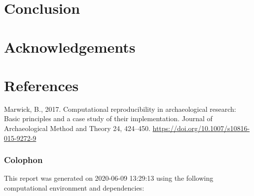 \documentclass[
]{article}
\begin{document}
\hypertarget{conclusion}{%
\section{Conclusion}\label{conclusion}}

\hypertarget{acknowledgements}{%
\section{Acknowledgements}\label{acknowledgements}}

\newpage

\hypertarget{references}{%
\section{References}\label{references}}

\hypertarget{refs}{}
\leavevmode\hypertarget{ref-Marwick2017}{}%
Marwick, B., 2017. Computational reproducibility in archaeological research: Basic principles and a case study of their implementation. Journal of Archaeological Method and Theory 24, 424--450. \url{https://doi.org/10.1007/s10816-015-9272-9}

\newpage

\hypertarget{colophon}{%
\subsubsection{Colophon}\label{colophon}}

This report was generated on 2020-06-09 13:29:13 using the following computational environment and dependencies:
\end{document}
